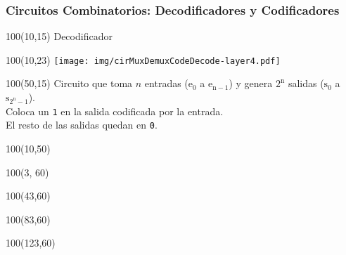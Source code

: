 \documentclass[aspectratio=169]{beamer}
\begin{document}
\begin{frame}[fragile]
    \frametitle{Circuitos Combinatorios: Decodificadores y Codificadores}
    \begin{textblock}{100}(10,15) Decodificador \end{textblock}
    \begin{textblock}{100}(10,23) \texttt{[image: img/cirMuxDemuxCodeDecode-layer4.pdf]} \end{textblock}
    \begin{textblock}{100}(50,15)
    \small Circuito que toma $n$ entradas ($\mathrm{e_0}$ a $\mathrm{e_{n-1}}$) y genera $\mathrm{2^n}$ salidas ($\mathrm{s_0}$ a $\mathrm{s_{2^n-1}}$).\\
    \bigskip
    Coloca un \texttt{1} en la salida codificada por la entrada.\\ El resto de las salidas quedan en \texttt{0}.
    \end{textblock}
    \begin{textblock}{100}(10,50)   \end{textblock}
    \begin{textblock}{100}(3, 60)   \end{textblock}
    \begin{textblock}{100}(43,60)   \end{textblock}
    \begin{textblock}{100}(83,60)   \end{textblock}
    \begin{textblock}{100}(123,60)  \end{textblock}
\end{frame}
\end{document}
